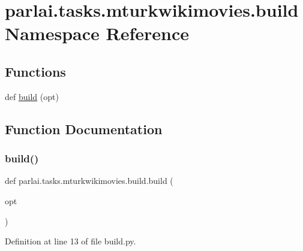 \hypertarget{namespaceparlai_1_1tasks_1_1mturkwikimovies_1_1build}{}\section{parlai.\+tasks.\+mturkwikimovies.\+build Namespace Reference}
\label{namespaceparlai_1_1tasks_1_1mturkwikimovies_1_1build}
\subsection*{Functions}
\begin{DoxyCompactItemize}
\item 
def \hyperlink{namespaceparlai_1_1tasks_1_1mturkwikimovies_1_1build_aa6711f21fb369b452d25f98897f305d7}{build} (opt)
\end{DoxyCompactItemize}


\subsection{Function Documentation}
\mbox{\label{namespaceparlai_1_1tasks_1_1mturkwikimovies_1_1build_aa6711f21fb369b452d25f98897f305d7}} 
\subsubsection{\texorpdfstring{build()}{build()}}
{\footnotesize\ttfamily def parlai.\+tasks.\+mturkwikimovies.\+build.\+build (\begin{DoxyParamCaption}\item[{}]{opt }\end{DoxyParamCaption})}



Definition at line 13 of file build.\+py.


